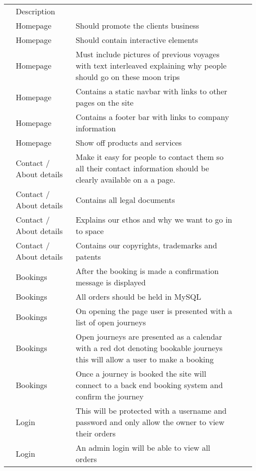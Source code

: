 \documentclass{article}
\newcounter{rowcount}
\begin{document}
    \begin{tabular} {>{\stepcounter{rowcount}\therowcount}p{0.5cm}@{}*{2}{p{3cm}|p{12cm}}}
    \hline
       \multicolumn{2}{l}{Functional Requirements} & Description \\
       \noalign{\setcounter{rowcount}{0}} \hline
    & Homepage & Should promote the clients business \\
    \hline
    & Homepage & Should contain interactive elements \\
    \hline
    & Homepage & Must include pictures of previous voyages with text interleaved explaining why people should go on these moon trips\\
    \hline
    & Homepage & Contains a static navbar with links to other pages on the site\\
    \hline
    & Homepage & Contains a footer bar with links to company information \\
    \hline
    & Homepage & Show off products and services \\
    \hline
    & Contact / About details & Make it easy for people to contact them so all their contact information should be clearly available on a a page. \\
    \hline
    & Contact / About details & Contains all legal documents \\
    \hline
    & Contact / About details & Explains our ethos and why we want to go in to space \\
    \hline
    & Contact / About details & Contains our copyrights, trademarks and patents \\
    \hline
    & Bookings & After the booking is made a confirmation message is displayed \\
    \hline
    & Bookings & All orders should be held in MySQL\\
    \hline
    & Bookings & On opening the page user is presented with a list of open journeys \\
    \hline
    & Bookings & Open journeys are presented as a calendar with a red dot denoting bookable journeys this will allow a user to make a booking\\
    \hline
    & Bookings & Once a journey is booked the site will connect to a back end booking system and confirm the journey\\
    \hline
    & Login & This will be protected with a username and password and only allow the owner to view their orders \\
    \hline
    & Login & An admin login will be able to view all orders \\

\end{tabular}
\end{document}
